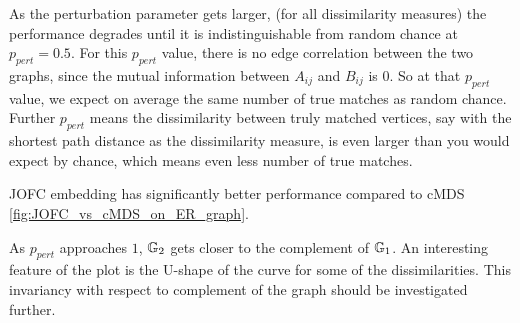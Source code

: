 \documentclass[12pt,oneside,final]{thesis}
\begin{document}
 As the perturbation parameter gets larger, (for all dissimilarity measures) the performance  degrades until it is indistinguishable from random chance at $p_{pert}=0.5$. For this $p_{pert}$ value, there is no edge correlation between the two graphs, since the mutual information between $A_{ij}$ and $B_{ij}$ is 0. So at that  $p_{pert}$ value, we expect on average the same number of true matches as random chance. Further $p_{pert}$ means the dissimilarity between truly matched vertices, say  with the shortest path distance as the dissimilarity measure, is even larger than you would expect by chance, which means even less number of true matches.




\begin{knitrout}
\color{fgcolor}\begin{kframe}


{\ttfamily\noindent\color{warningcolor}{\#\# Warning: there is no package called 'arrayhelpers'\\\#\# Warning: there is no package called 'ggplot2'}}

{\ttfamily\noindent\bfseries{}}

{\ttfamily\noindent\bfseries\color{errorcolor}{\#\# Error: object 'nc.cmds.lf' not found}}

{\ttfamily\noindent\bfseries\color{errorcolor}{\#\# Error: object 'nc.jofc.lf' not found}}

{\ttfamily\noindent\bfseries\color{errorcolor}{\#\# Error: object 'nc.jofc.shortpath.lf' not found}}

{\ttfamily\noindent\bfseries\color{errorcolor}{\#\# Error: object 'nc.jofc.shortpath.lf' not found}}

{\ttfamily\noindent\bfseries{}}

{\ttfamily\noindent\bfseries{}}\end{kframe}
\end{knitrout}


JOFC embedding  has significantly better performance compared to cMDS \ref{fig:JOFC_vs_cMDS_on_ER_graph}. 



As $p_{pert}$ approaches $1$, $\mathbb{G}_2$ gets closer to the complement of $\mathbb{G}_1$. An interesting feature of the plot is the U-shape of the curve for some of the dissimilarities. This invariancy with respect to complement of the graph should be investigated further.  
\end{document}
